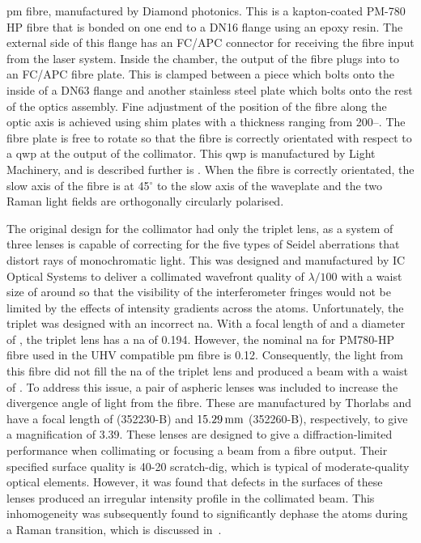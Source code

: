 \ac{pm} fibre, manufactured by Diamond photonics. This is a kapton-coated PM-780
HP fibre that is bonded on one end to a DN16 flange using an epoxy resin. The
external side of this flange has an FC/APC connector for receiving the
fibre input from the laser system. Inside the chamber, the output of the fibre plugs into to an FC/APC fibre
plate. This is clamped between a piece which bolts onto the inside of a DN63
flange and another stainless steel plate which bolts onto the rest of the optics
assembly. Fine adjustment of the position of the fibre along the optic axis is
achieved using shim plates with a thickness ranging from
200--. The fibre plate is free to rotate so
that the fibre is correctly orientated with respect to a \ac{qwp} at the output of the
collimator. This \ac{qwp} is manufactured by Light Machinery, and is described
further is . When the fibre is correctly
orientated, the slow axis of the fibre is at 45$^\circ$ to the slow
axis of the waveplate and the two Raman light fields are orthogonally circularly
polarised. 
\par\noindent 
The original design for the collimator had only the triplet lens, as a system of three lenses is capable of correcting for the
five types of Seidel aberrations that distort rays of monochromatic light. This
was designed and manufactured by IC Optical Systems to deliver a
collimated wavefront quality of $\lambda/100$ with a waist size
of around  so that the visibility of the
interferometer fringes would not be limited by the effects of intensity gradients across the
atoms. Unfortunately, the triplet was designed with an incorrect \ac{na}. With a
focal length of  and a diameter of
, the triplet lens has a \ac{na} of 0.194. However,
the nominal \ac{na} for PM780-HP fibre used in the UHV compatible \ac{pm} fibre
is 0.12. Consequently, the light from this fibre did not fill the \ac{na} of the
triplet lens and produced a beam with a waist of . 
To address this issue, a pair of aspheric lenses was included to increase
the divergence angle of light from the fibre. These are manufactured by Thorlabs
and have a focal length of  (352230-B) and
\(\sivalue{15.29}{\milli\metre}\) (352260-B), respectively, to give a
magnification of 3.39. These lenses are designed to give a diffraction-limited
performance when collimating or focusing a beam from a fibre output.
Their specified surface quality is 40-20 scratch-dig, which is typical
of moderate-quality optical elements. However, it
was found that defects in the surfaces of these lenses produced an
irregular intensity profile in the collimated beam. This inhomogeneity
was subsequently found to significantly dephase the atoms during a
Raman transition, which is discussed
in~.
